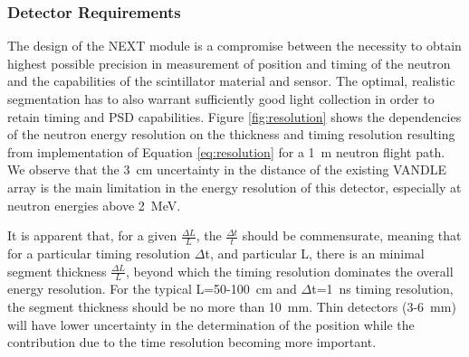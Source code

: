 \documentclass[preprint,3p,twocolumn]{elsarticle}
\begin{document}
\subsubsection{Detector Requirements}

The design of the NEXT module is a compromise between the necessity to obtain highest possible precision in measurement of position and timing of the neutron and the capabilities of the scintillator material and sensor. The optimal, realistic segmentation has to also warrant sufficiently good light collection in order to retain timing and PSD capabilities. Figure \ref{fig:resolution} shows the dependencies of the  neutron energy resolution on the thickness and timing resolution resulting from implementation of Equation \ref{eq:resolution} for a 1~m neutron flight path. We observe that the 3~cm uncertainty in the distance of the existing VANDLE \cite{PETERS2016122} array is the main limitation in the energy resolution of this detector, especially at neutron energies above 2~MeV.

It is apparent that, for a given $\frac{\Delta L}{L}$, the $\frac{\Delta t}{t}$  should be commensurate, meaning that for a particular timing resolution $\Delta$t, and particular L, there is an minimal segment thickness $\frac{\Delta L}{L}$, beyond which the timing resolution dominates the overall energy resolution. For the typical L=50-100~cm and $\Delta$t=1~ns  timing resolution, the segment thickness should be no more than 10~mm. Thin detectors (3-6~mm) will have lower uncertainty in the determination of the position while the contribution due to the time resolution becoming more important.
\end{document}
